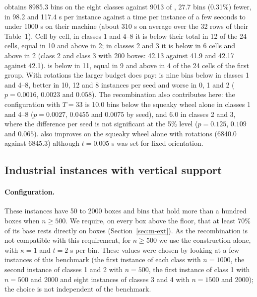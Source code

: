 \cfgqual{} obtains 8985.3 bins on the eight classes against 9013 of \citet{Mahvash2018}, 27.7 bins (0.31\%) fewer, in 98.2 and 117.4 s per instance against a time per instance
of a few seconds to under 1000 s on their machine (about 310 s on average over the 32 rows of their Table~1). Cell by cell, in classes 1 and 4--8 it is below their total in 12 of the 24 cells, equal in 10 and above in 2; in
classes 2 and 3 it is below in 6 cells and above in 2 (class 2 and class 3 with 200 boxes: 42.13 against 41.9 and 42.17 against 42.1). \cfgbal{} is below in 11, equal in 9 and above in 4
of the 24 cells of the first group. With rotations the larger budget does pay: \cfgqual{} is nine bins below \cfgbal{} in classes 1 and 4--8, better in 10, 12 and 8 instances per seed and worse in 0, 1 and 2
($p=0.0016$, $0.0023$ and $0.058$). The recombination also contributes here: the configuration with $T=33$ is 10.0 bins below the squeaky wheel alone
in classes 1 and 4--8 ($p=0.0027$, $0.0455$ and $0.0075$ by seed), and 6.0 in classes 2 and 3, where the difference per seed is not significant at the 5\% level ($p=0.125$, $0.109$ and $0.065$).
\cfgfast{} also improves on the squeaky wheel alone with rotations (6840.0 against 6845.3) although $t=0.005$ s was set for fixed orientation.

\subsection{Industrial instances with vertical support}
\label{sec:e-ind}

\paragraph{Configuration.}
These instances have 50 to 2000 boxes and bins that hold more than a hundred boxes when $n\ge 500$. We require, on every box above the floor, that at least 70\% of its
base rests directly on boxes (Section~\ref{sec:m-ext}). As the recombination is not compatible with this requirement, for $n\ge 500$ we use the construction alone, with $\kappa=1$ and $t=2$ s per bin.
These values were chosen by looking at a few instances of this benchmark (the first instance of each class with $n=1000$, the second instance of classes 1 and 2 with $n=500$, the first instance of class 1 with $n=500$ and 2000 and eight
instances of classes 3 and 4 with $n=1500$ and 2000); the choice is not independent of the benchmark.

